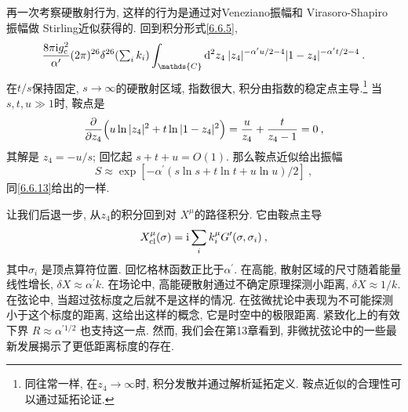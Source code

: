 再一次考察硬散射行为, 这样的行为是通过对Veneziano振幅和 Virasoro-Shapiro 振幅做 Stirling近似获得的. 回到积分形式\eqref{6.6.5},
\begin{equation}
	\frac{8 \pi \mi g_{\mathrm{c}}^{2}}{\alpha^{\prime}} (2\pi)^{26} \delta^{26}({\textstyle \sum_{i} k_{i}}) 
	\int_{\mathds{C}} \dif^{2} z_{4} \: |z_{4}|^{-\alpha^{\prime}u/2 - 4}|1-z_{4}|^{-\alpha^{\prime} t/2 - 4} \:. \label{9.8.1}
\end{equation}
在$t/s$保持固定, $s \rightarrow \infty$的硬散射区域, 指数很大, 积分由指数的稳定点主导.\footnote{同往常一样, 在$z_{4}\to \infty$时, 
积分发散并通过解析延拓定义. 鞍点近似的合理性可以通过延拓论证.} 当 $s, t, u \gg 1$时, 鞍点是
\begin{equation}
	\frac{\partial}{\partial z_{4}}\Bigl(u \ln |z_{4}|^{2}+t \ln |1-z_{4}|^{2}\Bigr) = 
	\frac{u}{z_{4}} + \frac{t}{z_{4}-1} = 0 \:, \label{9.8.2}
\end{equation}
其解是 $z_{4} = -u/s$; 回忆起 $s+t+u=O(1)$. 那么鞍点近似给出振幅
\begin{equation}
	S \approx \exp [-\alpha^{\prime}(s \ln s + t \ln t + u \ln u) / 2] \:, \label{9.8.3}
\end{equation}
同\eqref{6.6.13}给出的一样.

让我们后退一步, 从$z_{4}$的积分回到对 $X^{\mu} $的路径积分. 它由鞍点主导
\begin{equation}
	X_{\mathrm{cl}}^{\mu}(\sigma) = \mathrm{i} \sum_{i} k_{i}^{\mu} G^{\prime}(\sigma, \sigma_{i}) \:, \label{9.8.4}
\end{equation}
其中$\sigma_{i}$ 是顶点算符位置. 回忆格林函数正比于$\alpha^{\prime}$. 在高能, 散射区域的尺寸随着能量线性增长, $\delta X \approx \alpha^{\prime} k$. 
在场论中, 高能硬散射通过不确定原理探测小距离, $\delta X \approx 1 / k$. 在弦论中, 当超过弦标度之后就不是这样的情况. 
在弦微扰论中表现为不可能探测小于这个标度的距离, 这给出这样的概念, 它是时空中的极限距离. 
紧致化上的有效下界 $R \approx \alpha^{\prime 1/2}$ 也支持这一点. 然而, 我们会在第13章看到, 非微扰弦论中的一些最新发展揭示了更低距离标度的存在.


